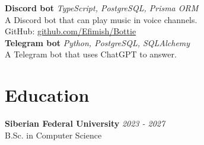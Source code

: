 \documentclass[a4paper, 12pt]{article}
\begin{document}
\textbf{Discord bot} \hfill \textit{TypeScript, PostgreSQL, Prisma ORM} \\
A Discord bot that can play music in voice channels. \\
GitHub: \href{https://github.com/Efimish/Bottie}{github.com/Efimish/Bottie} \\

\textbf{Telegram bot} \hfill \textit{Python, PostgreSQL, SQLAlchemy} \\
A Telegram bot that uses ChatGPT to answer.

\section{Education}

\textbf{Siberian Federal University}
\hfill \textit{2023 - 2027} \\
B.Sc. in Computer Science
\end{document}

